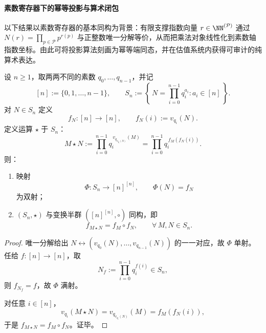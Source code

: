 \paragraph{素数寄存器下的幂等投影与算术闭包}
以下结果以素数寄存器的基本同构为背景：有限支撑指数向量
\(
r\in\NN^{(\mathcal P)}
\)
通过
\(
N(r)=\prod_{p\in\mathcal P}p^{r(p)}
\)
与正整数唯一分解等价，从而把乘法对象线性化到素数轴指数坐标。由此可将投影算法刻画为幂等端同态，并在估值系统内获得可审计的纯算术表达。

\begin{theorem}[有限算法半群的素数估值算术化与自指合成律]\label{thm:killo-finite-semigroup-prime-valuation-arithmetization}
设 \(n\ge 1\)，取两两不同的素数 \(q_0,\dots,q_{n-1}\)，并记
\[
[n]:=\{0,1,\dots,n-1\},
\qquad
S_n:=\left\{\,N=\prod_{i=0}^{n-1}q_i^{a_i}:a_i\in[n]\,\right\}.
\]
对 \(N\in S_n\) 定义
\[
f_N:[n]\to[n],\qquad f_N(i):=v_{q_i}(N).
\]
定义运算 \(\star\) 于 \(S_n\)：
\[
M\star N:=\prod_{i=0}^{n-1}q_i^{\,v_{q_{v_{q_i}(N)}}(M)}
=\prod_{i=0}^{n-1}q_i^{\,f_M(f_N(i))}.
\]
则：
\begin{enumerate}
  \item 映射
  \[
  \Phi:S_n\to [n]^{[n]},\qquad \Phi(N)=f_N
  \]
  为双射；
  \item \((S_n,\star)\) 与变换半群 \(([n]^{[n]},\circ)\) 同构，即
  \[
  f_{M\star N}=f_M\circ f_N,\qquad \forall\,M,N\in S_n.
  \]
\end{enumerate}
\end{theorem}
\begin{proof}
唯一分解给出
\(
N\leftrightarrow (v_{q_0}(N),\dots,v_{q_{n-1}}(N))
\)
的一一对应，故 \(\Phi\) 单射。任给 \(f:[n]\to[n]\)，取
\[
N_f:=\prod_{i=0}^{n-1}q_i^{f(i)}\in S_n,
\]
则 \(f_{N_f}=f\)，故 \(\Phi\) 满射。

对任意 \(i\in[n]\)，
\[
v_{q_i}(M\star N)=v_{q_{v_{q_i}(N)}}(M)=f_M(f_N(i)),
\]
于是 \(f_{M\star N}=f_M\circ f_N\)。证毕。
\end{proof}

